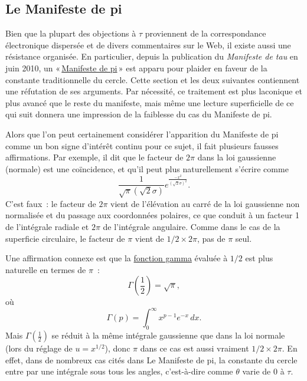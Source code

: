 
  \subsection{Le Manifeste de pi} %
  \label{sec:the_pi_manifesto_a_rebuttal}

Bien que la plupart des objections à $\tau$ proviennent de la correspondance
électronique dispersée et de divers commentaires sur le Web, il existe aussi une
résistance organisée. En particulier, depuis la publication du \emph{Manifeste
de tau} en juin 2010, un «\,\href{http://thepimanifesto.com/}{Manifeste de
pi}\,» est apparu pour plaider en faveur de la constante traditionnelle du
cercle. Cette section et les deux suivantes contiennent une réfutation de ses
arguments. Par nécessité, ce traitement est plus laconique et plus avancé que le
reste du manifeste, mais même une lecture superficielle de ce qui suit donnera
une impression de la faiblesse du cas du Manifeste de pi.

Alors que l'on peut certainement considérer l'apparition du Manifeste de pi
comme un bon signe d'intérêt continu pour ce sujet, il fait plusieurs fausses
affirmations. Par exemple, il dit que le facteur de $2\pi$ dans la loi
gaussienne (normale) est une coïncidence, et qu'il peut plus naturellement
s'écrire comme
\[
\frac{1}{\sqrt\pi(\sqrt 2\sigma)}e^{\frac{-x^2}{(\sqrt 2\sigma)^2}}.
\]
C'est faux~: le facteur de $2\pi$ vient de l'élévation au carré de la loi
gaussienne non normalisée et du passage aux coordonnées polaires, ce que conduit
à un facteur 1 de l'intégrale radiale et $2\pi$ de l'intégrale angulaire. Comme
dans le cas de la superficie circulaire, le facteur de $\pi$ vient de $1/2\times
2\pi$, pas de $\pi$ seul.

Une affirmation connexe est que la
\href{https://fr.wikipedia.org/wiki/Fonction_gamma}{fonction gamma} évaluée à
$1/2$ est plus naturelle en termes de $\pi$~:
\[
\Gamma(\textstyle{\frac{1}{2}}) = \sqrt{\pi},
\]
où
\begin{equation}
\label{eq:gamma}
\Gamma(p) = \int_{0}^{\infty} x^{p-1} e^{-x}\,dx.
\end{equation}
Mais $\Gamma(\frac{1}{2})$ se réduit à la même intégrale gaussienne que dans la
loi normale (lors du réglage de $u = x^{1/2}$), donc $\pi$ dans ce cas est aussi
vraiment $1/2\times 2\pi$. En effet, dans de nombreux cas cités dans Le
Manifeste de pi, la constante du cercle entre par une intégrale sous tous les
angles, c'est-à-dire comme $\theta$ varie de $0$ à $\tau$.

